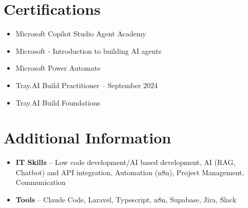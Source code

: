 \documentclass[a4paper,10pt]{article}
\begin{document}
\section{Certifications}
\begin{itemize}
\item Microsoft Copilot Studio Agent Academy
\item Microsoft - Introduction to building AI agents
\item Microsoft Power Automate
\item Tray.AI Build Practitioner -- September 2024
\item Tray.AI Build Foundations
\end{itemize}

\section{Additional Information}
\begin{itemize}
\item \textbf{IT Skills} -- Low code development/AI based development, AI (RAG, Chatbot) and API integration, Automation (n8n), Project Management, Communication
\item \textbf{Tools} -- Claude Code, Laravel, Typescript, n8n, Supabase, Jira, Slack
\end{itemize}
\end{document}
